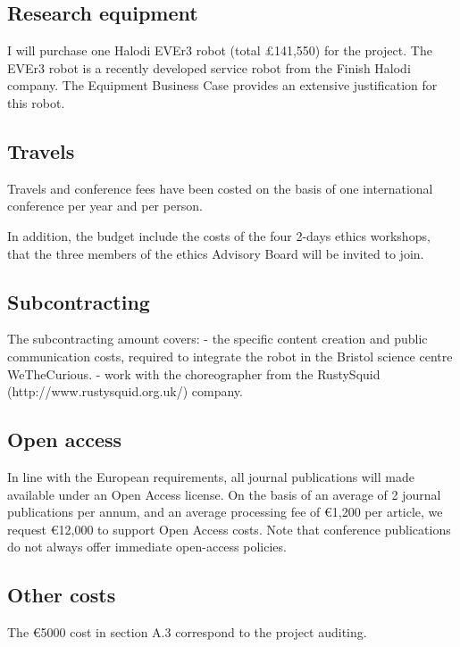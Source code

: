 \subsection{Research equipment}

I will purchase one Halodi EVEr3 robot (total £141,550) for the \project
project. The EVEr3 robot is a recently developed service robot from the Finish
Halodi company. The Equipment Business Case provides an extensive justification
for this robot.

\subsection{Travels}

Travels and conference fees have been costed on the basis of one international
conference per year and per person.

In addition, the budget include the costs of the four 2-days ethics workshops,
that the three members of the ethics Advisory Board will be invited to join.

\subsection{Subcontracting}

The subcontracting amount covers:
- the specific content creation and public communication costs, required to 
integrate the robot in the Bristol science centre WeTheCurious.
- work with the choreographer from the RustySquid
(http://www.rustysquid.org.uk/) company.

\subsection{Open access}

In line with the European requirements, all journal publications will made
available under an Open Access license.  On the basis of an average of 2 journal
publications per annum, and an average processing fee of €1,200 per article, we
request €12,000 to support Open Access costs. Note that conference publications
do not always offer immediate open-access policies.

\subsection{Other costs}

The €5000 cost in section A.3 correspond to the project auditing.

